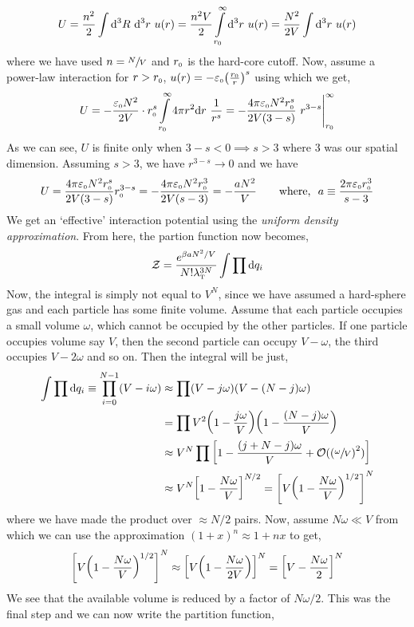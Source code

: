 $$U = \frac{n^2}{2}\int \dd^3 R\ \dd^3 r \ u(r) = \frac{n^2V}{2}\int\limits_{r\tund{0}}^\infty \dd^3 r \ u(r)= \frac{N^2}{2V}\int \dd^3 r \ u(r)$$
where we have used $n = \sfrac{N}{V}$ and $r_{\text{\tiny 0}}$ is the hard-core cutoff. Now, assume a power-law interaction for $r>r_{\text{\tiny 0}}$, 
$u(r) = -\varepsilon_{\text{\tiny 0}}\qty(\frac{r_{\text{\tiny 0}}}{r})^s$ using which we get, 
\begin{align*}
    U =-\frac{\varepsilon\tund{0} N^2}{2V}\cdot r\tund{0}^s \int\limits_{r\tund{0}}^\infty 4\pi r^2 \dd r\ \frac{1}{r^s} = -\frac{4\pi\varepsilon\tund{0} N^2r\tund{0}^s}{2V(3-s)}\ r^{3-s}\Bigg|^\infty_{r\tund{0}}
\end{align*}
As we can see, $U$ is finite only when $3-s<0\implies s>3$ where $3$ was our spatial dimension. Assuming $s>3$, we have $r^{3-s}\to 0$ and we have 
$$U = \frac{4\pi\varepsilon_{\text{\tiny 0}} N^2r_{\text{\tiny 0}}^s}{2V(3-s)}r_{\text{\tiny 0}}^{3-s} = -\frac{4\pi\varepsilon_{\text{\tiny 0}} N^2r_{\text{\tiny 0}}^3}{2V(s-3)} = -\frac{aN^2}{V}\qquad \text{where,}\ \  a\equiv \frac{2\pi \varepsilon_{\text{\tiny 0}}r_{\text{\tiny 0}}^3}{s-3} $$
We get an `effective' interaction potential using the \textit{uniform density approximation}. From here, the partion function now becomes,
$$\mathcal Z = \frac{e^{\beta aN^2/V}}{N! \lambda_{\text{\tiny T}}^{3N}}\int \prod\dd q_i$$
Now, the integral is simply not equal to $V^N$, since we have assumed a hard-sphere gas and each particle has some finite volume. Assume that each particle occupies a small volume $\omega$, which cannot be occupied by the other particles. If one particle occupies volume say $V$, then the second particle can occupy $V-\omega$, the third occupies $V-2\omega$ and so on. Then the integral will be just,
\begin{align*}
    \int \prod \dd q_i \equiv \prod\limits_{i=0}^{N-1} (V-i\omega) &\approx \prod (V-j\omega)(V-(N-j)\omega)\\
&=\prod V^2\qty(1 - \frac{j\omega}{V})\qty(1 - \frac{(N-j)\omega}{V})\\
&\approx V^N \prod \qty[1 - \frac{(j+N-j)\omega}{V}+ \mathcal O(\qty(\sfrac{\omega}{V})^2)]\\
&\approx V^N\qty[1 - \frac{N\omega}{V}]^{N/2} = \qty[V\qty(1-\frac{N\omega}{V})^{1/2}]^N
\end{align*}
where we have made the product over $\approx N/2$ pairs. Now, assume $N\omega \ll V$ from which we can use the approximation $(1+x)^n \approx 1+nx$ to get,
$$\qty[V\qty(1-\frac{N\omega}{V})^{1/2}]^N \approx \qty[V\qty(1-\frac{N\omega}{2V})]^N = \qty[V-\frac{N\omega}{2}]^N$$
We see that the available volume is reduced by a factor of $N\omega/2$. This was the final step and we can now write the partition function,
